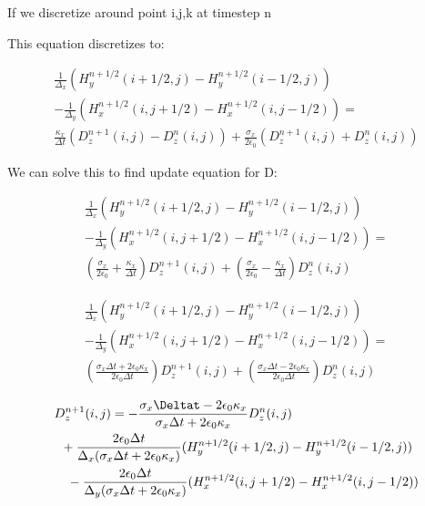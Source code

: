 \documentclass{article}
\begin{document}
If we discretize around point i,j,k at timestep n

This equation discretizes to:

\begin{equation}
\begin{multlined}
  \frac{1}{\Delta_{x}}(H_{y}^{n+1/2}(i+1/2,j)-H_{y}^{n+1/2}(i-1/2,j)) \\
 -\frac{1}{\Delta_{y}}(H_{x}^{n+1/2}(i,j+1/2)-H_{x}^{n+1/2}(i,j-1/2))= \\
  \frac{\kappa_{x}}{\Delta t}
   (D_{z}^{n+1}(i,j)-D_{z}^{n}(i,j))+
   \frac{\sigma_{x}}{2 \epsilon_{0}}
   (D_{z}^{n+1}(i,j)+D_{z}^{n}(i,j))
\end{multlined}
\end{equation}


 We can solve this to find update equation for D:

\begin{equation}
\begin{multlined}
  \frac{1}{\Delta_{x}}(H_{y}^{n+1/2}(i+1/2,j)-H_{y}^{n+1/2}(i-1/2,j)) \\
 -\frac{1}{\Delta_{y}}(H_{x}^{n+1/2}(i,j+1/2)-H_{x}^{n+1/2}(i,j-1/2))= \\
  (\frac{\sigma_{x}}{2\epsilon_{0}}+\frac{\kappa_{x}}{\Delta t})D_{z}^{n+1}(i,j)+
  (\frac{\sigma_{x}}{2\epsilon_{0}}-\frac{\kappa_{x}}{\Delta t})D_{z}^{n}(i,j)
\end{multlined}
\end{equation}

\begin{equation}
\begin{multlined}
  \frac{1}{\Delta_{x}}(H_{y}^{n+1/2}(i+1/2,j)-H_{y}^{n+1/2}(i-1/2,j)) \\
 -\frac{1}{\Delta_{y}}(H_{x}^{n+1/2}(i,j+1/2)-H_{x}^{n+1/2}(i,j-1/2))= \\
  (\frac{\sigma_{x}\Delta t+2\epsilon_{0}\kappa_{x}}{2\epsilon_{0}\Delta t})D_{z}^{n+1}(i,j)+
  (\frac{\sigma_{x}\Delta t-2\epsilon_{0}\kappa_{x}}{2\epsilon_{0}\Delta t})D_{z}^{n}(i,j)
\end{multlined}
\end{equation}

\begin{equation}
\begin{multlined}
  D_{z}^{n+1}(i,j) = -\frac{\sigma_{x}\Deltat-2\epsilon_{0}\kappa_{x}}{\sigma_{x}\Delta t+2\epsilon_{0}\kappa_{x}}D_{z}^{n}(i,j) \\
  +\frac{2\epsilon_{0}\Delta t}{\Delta_{x}(\sigma_{x}\Delta t+2\epsilon_{0}\kappa_{x})}(H_{y}^{n+1/2}(i+1/2,j)-H_{y}^{n+1/2}(i-1/2,j)) \\
 -\frac{2\epsilon_{0}\Delta t}{\Delta_{y}(\sigma_{x}\Delta t+2\epsilon_{0}\kappa_{x})}(H_{x}^{n+1/2}(i,j+1/2)-H_{x}^{n+1/2}(i,j-1/2))
\end{multlined}
\end{equation}
\end{document}
